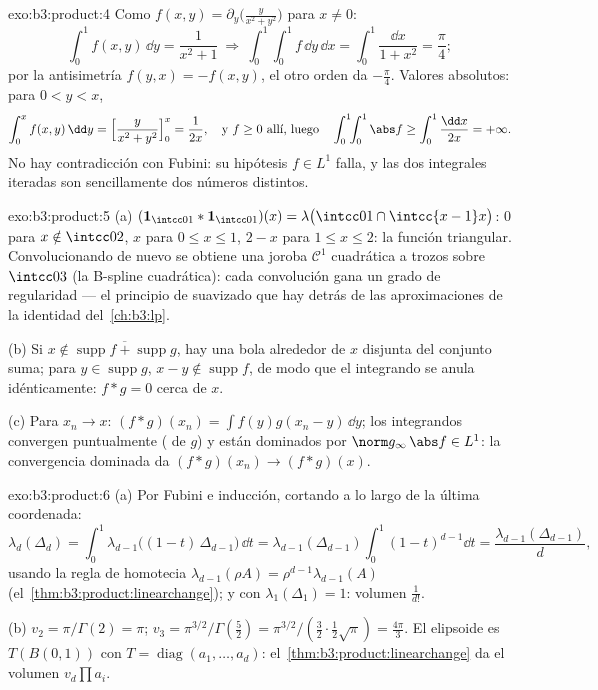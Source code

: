 \begin{solution}{exo:b3:product:4}
Como $f(x,y) = \partial_y\bigl(\frac{y}{x^2+y^2}\bigr)$ para
$x \ne 0$:
\[
\int_0^1 f(x, y)\,\dd y = \frac{1}{x^2 + 1}
\ \Longrightarrow\
\int_0^1\!\!\int_0^1 f\,\dd y\,\dd x =
\int_0^1\frac{\dd x}{1 + x^2} = \frac\pi4 ;
\]
por la antisimetría $f(y,x) = -f(x,y)$, el otro orden da $-\frac\pi4$.
Valores absolutos: para $0 < y < x$,
\[
\int_0^x f(x,y)\,\dd y = \Bigl[\frac{y}{x^2 +
y^2}\Bigr]_0^x = \frac1{2x},
\quad\text{y } f \geq 0 \text{ allí, luego}\quad
\int_0^1\!\!\int_0^1\abs f \geq \int_0^1\frac{\dd x}{2x} =
+\infty .
\]
No hay contradicción con Fubini: su hipótesis $f \in L^1$ falla, y las
dos integrales iteradas son sencillamente dos números distintos.
\end{solution}

\begin{solution}{exo:b3:product:5}
(a) $(\mathbf 1_{\intcc01}*\mathbf 1_{\intcc01})(x) =
\lambda\bigl(\intcc01\cap\intcc{x-1}x\bigr)$: $0$ para $x
\notin \intcc02$, $x$ para $0 \leq x \leq 1$, $2 - x$ para $1
\leq x \leq 2$: la función triangular. Convolucionando de nuevo se
obtiene una joroba $\mathcal
C^1$ cuadrática a trozos sobre $\intcc03$ (la B-spline cuadrática): cada
convolución gana un grado de regularidad --- el principio de suavizado
que hay detrás de las aproximaciones de la identidad
del~\cref{ch:b3:lp}.

(b) Si $x \notin \overline{\operatorname{supp}f +
\operatorname{supp}g}$, hay una bola alrededor de $x$ disjunta del
conjunto suma; para $y \in \operatorname{supp}g$, $x - y
\notin\operatorname{supp}f$, de modo que el integrando se anula
idénticamente: $f * g = 0$ cerca de $x$.

(c) Para $x_n \to x$: $(f*g)(x_n) = \int
f(y)g(x_n - y)\,\dd y$; los integrandos convergen puntualmente
( de $g$) y están
dominados por $\norm
g_\infty\,\abs f \in L^1$: la convergencia dominada da
$(f*g)(x_n) \to (f*g)(x)$.
\end{solution}

\begin{solution}{exo:b3:product:6}
(a) Por Fubini e inducción, cortando a lo largo de la última coordenada:
\[
\lambda_d(\Delta_d) = \int_0^1
\lambda_{d-1}\bigl((1 - t)\,\Delta_{d-1}\bigr)\,\dd t
= \lambda_{d-1}(\Delta_{d-1})\int_0^1(1 - t)^{d-1}\dd t
= \frac{\lambda_{d-1}(\Delta_{d-1})}{d},
\]
usando la regla de homotecia $\lambda_{d-1}(\rho A) =
\rho^{d-1}\lambda_{d-1}(A)$ (el~\cref{thm:b3:product:linearchange}); y
con $\lambda_1(\Delta_1) = 1$: volumen $\frac1{d!}$.

(b) $v_2 = \pi/\Gamma(2) = \pi$; $v_3 =
\pi^{3/2}/\Gamma(\frac52) = \pi^{3/2}/(\frac32\cdot\frac12
\sqrt\pi) = \frac{4\pi}3$. El elipsoide es $T(B(0,1))$ con
$T = \operatorname{diag}(a_1, \dots, a_d)$:
el~\cref{thm:b3:product:linearchange} da el volumen
$v_d\prod a_i$.
\end{solution}

